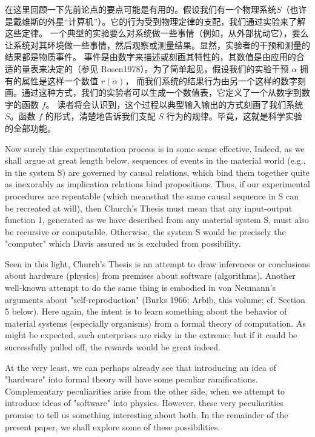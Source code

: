 \documentclass[a4paper,12pt]{article}
\begin{document}
在这里回顾一下先前论点的要点可能是有用的。假设我们有一个物理系统$S$（也许是戴维斯的外星“计算机”）。它的行为受到物理定律的支配，我们通过实验来了解这些定律。
一个典型的实验要么对系统做一些事情（例如，从外部扰动它），要么让系统对其环境做一些事情，然后观察或测量结果。显然，实验者的干预和测量的结果都是物质事件。
事件是由数字来描述或刻画其特性的，其数值是由应用的合适的量表来决定的（参见 Rosen1978）。为了简单起见，假设我们的实验干预 $\alpha$ 拥有的属性是这样一个数值 $r(\alpha)$，
而我们系统的结果行为由另一个这样的数字刻画。通过这种方式，我们的实验者可以生成一个数值表，它定义了一个从数字到数字的函数 $f$。
读者将会认识到，这个过程以典型输入输出的方式刻画了我们系统 $S$。函数 $f$ 的形式，清楚地告诉我们支配 $S$ 行为的规律。毕竟，这就是科学实验的全部功能。

Now surely this experimentation process is in some sense effective. Indeed, as we shall argue at great length below, sequences of events in the
material world (e.g., in the system S) are governed by causal relations, which bind them together quite as inexorably as implication relations
bind propositions. Thus, if our experimental procedures are repeatable (which meansthat the same causal sequence in S can be recreated at will),
then Church's Thesis must mean that any input-output function 1, generated as we have described from any material system S,
must also be recursive or computable. Otherwise, the system S would be precisely the "computer" which Davis assured us is excluded from possibility.

Seen in this light, Church's Thesis is an attempt to draw inferences or conclusions about hardware (physics) from premises about software
(algorithms). Another well-known attempt to do the same thing is embodied in von Neumann's arguments about "self-reproduction"
(Burks 1966; Arbib, this volume; cf. Section 5 below). Here again, the intent is to learn something about the behavior of material systems
(especially organisms) from a formal theory of computation. As might be expected, such enterprises are risky in the extreme;
but if it could be successfully pulled off, the rewards would be great indeed.

At the very least, we can perhaps already see that introducing an idea of "hardware" into formal theory will have some peculiar
ramifications. Complementary peculiarities arise from the other side, when we attempt to introduce ideas of "software" into physics.
However, these very peculiarities promise to tell us something interesting about both. In the remainder of the present paper, we shall
explore some of these possibilities.
\end{document}
